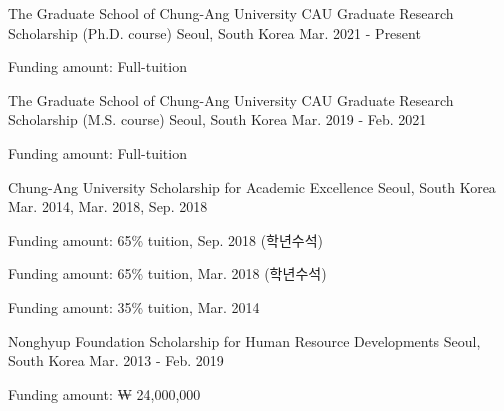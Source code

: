 \documentclass[11pt, a4paper]{awesome-cv} %
\begin{document}
\begin{cventries}
	\cventry
	{The Graduate School of Chung-Ang University} %
	{CAU Graduate Research Scholarship (Ph.D. course)} %
	{Seoul, South Korea} %
	{Mar. 2021 - Present} %
	{
		\begin{cvitems}
			\item{Funding amount: Full-tuition}
		\end{cvitems}
	}

	\cventry
	{The Graduate School of Chung-Ang University} %
	{CAU Graduate Research Scholarship (M.S. course)} %
	{Seoul, South Korea} %
	{Mar. 2019 - Feb. 2021} %
	{
		\begin{cvitems}
			\item{Funding amount: Full-tuition}
		\end{cvitems}
	}

	\cventry
	{Chung-Ang University} %
	{Scholarship for Academic Excellence} %
	{Seoul, South Korea} %
	{Mar. 2014,  Mar. 2018, Sep. 2018} %
	{
		\begin{cvitems}
			\item{Funding amount: 65\% tuition, Sep. 2018 (학년수석)}
			\item{Funding amount: 65\% tuition, Mar. 2018 (학년수석)}
			\item{Funding amount: 35\% tuition, Mar. 2014}
		\end{cvitems}
	}
	
	\cventry
	{Nonghyup Foundation} %
	{Scholarship for Human Resource Developments} %
	{Seoul, South Korea} %
	{Mar. 2013 - Feb. 2019} %
	{
		\begin{cvitems}
			\item{Funding amount: ₩ 24,000,000}
		\end{cvitems}
	}
\end{cventries}
%	
%	
%	
\end{document}
